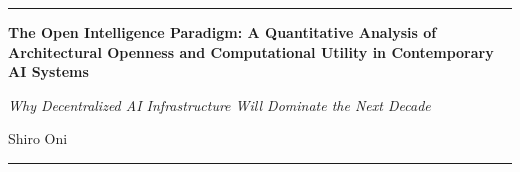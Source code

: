 \documentclass[10pt,a4paper]{article}
\newcommand{\papertitle}[1]{%
    {\LARGE\bfseries #1}%
}
\newcommand{\papersubtitle}[1]{%
    {\large\textit{#1}}%
}
\newcommand{\authorlist}[1]{%
    {\normalsize #1}%
}
\begin{document}
\thispagestyle{firstpage}

\noindent\rule{\textwidth}{0.4pt}

\vspace{1em}

\begin{center}
\papertitle{The Open Intelligence Paradigm: A Quantitative Analysis of Architectural Openness and Computational Utility in Contemporary AI Systems}

\vspace{0.5em}

\papersubtitle{Why Decentralized AI Infrastructure Will Dominate the Next Decade}

\vspace{1.5em}

\authorlist{Shiro Oni \\ }


\vspace{0.5em}



\end{center}

\vspace{1em}

\noindent\rule{\textwidth}{0.4pt}

\vspace{1em}
\end{document}
